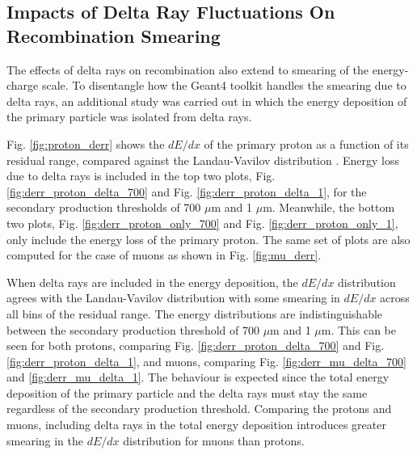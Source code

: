 \subsection{Impacts of Delta Ray Fluctuations On Recombination Smearing}
\label{sec:impactDeltaRaySmear}

The effects of delta rays on recombination also extend to smearing of the energy-charge scale.
To disentangle how the Geant4 toolkit handles the smearing due to delta rays, an additional study was carried out in which the energy deposition of the primary particle was isolated from delta rays. 

Fig. \ref{fig:proton_derr} shows the $dE/dx$ of the primary proton as a function of its residual range, compared against the Landau-Vavilov distribution \cite{Passage}.
Energy loss due to delta rays is included in the top two plots, Fig. \ref{fig:derr_proton_delta_700} and Fig. \ref{fig:derr_proton_delta_1}, for the secondary production thresholds of 700 $\mu$m and 1 $\mu$m.
Meanwhile, the bottom two plots, Fig. \ref{fig:derr_proton_only_700} and Fig. \ref{fig:derr_proton_only_1}, only include the energy loss of the primary proton.
The same set of plots are also computed for the case of muons as shown in Fig. \ref{fig:mu_derr}.

When delta rays are included in the energy deposition, the $dE/dx$ distribution agrees with the Landau-Vavilov distribution with some smearing in $dE/dx$ across all bins of the residual range.
The energy distributions are indistinguishable between the secondary production threshold of 700 $\mu$m and 1 $\mu$m.
This can be seen for both protons, comparing Fig. \ref{fig:derr_proton_delta_700} and Fig. \ref{fig:derr_proton_delta_1}, and muons, comparing Fig. \ref{fig:derr_mu_delta_700} and \ref{fig:derr_mu_delta_1}. 
The behaviour is expected since the total energy deposition of the primary particle and the delta rays must stay the same regardless of the secondary production threshold.
Comparing the protons and muons, including delta rays in the total energy deposition introduces greater smearing in the $dE/dx$ distribution for muons than protons.

